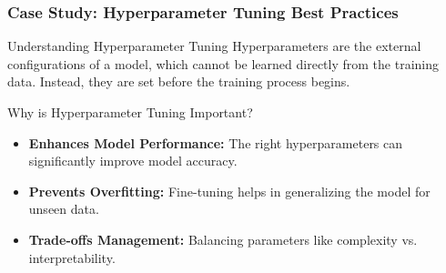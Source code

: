 \documentclass[aspectratio=169]{beamer}
\begin{document}
\begin{frame}
    \frametitle{Case Study: Hyperparameter Tuning Best Practices}
    \begin{block}{Understanding Hyperparameter Tuning}
    Hyperparameters are the external configurations of a model, which cannot be learned directly from the training data. Instead, they are set before the training process begins.
    \end{block}
    
    \begin{block}{Why is Hyperparameter Tuning Important?}
    \begin{itemize}
        \item \textbf{Enhances Model Performance:} The right hyperparameters can significantly improve model accuracy.
        \item \textbf{Prevents Overfitting:} Fine-tuning helps in generalizing the model for unseen data.
        \item \textbf{Trade-offs Management:} Balancing parameters like complexity vs. interpretability.
    \end{itemize}
    \end{block}
\end{frame}
\end{document}

